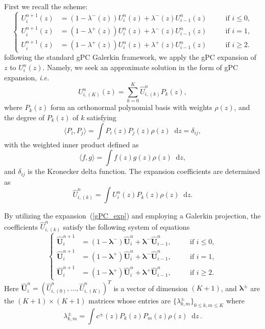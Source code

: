 \documentclass[12pt]{article}
\theoremstyle{plain}
\theoremstyle{remark}
\theoremstyle{remark}
\theoremstyle{remark}
\numberwithin{equation}{section}
\newcommand*\diff{\mathop{}\!\mathrm{d}}
\newcommand{\ie}{{\it i.e. \/}}
\newcommand{\Uniz}{U^n_i(z)}
\newcommand{\Unpiz}{U^{n+1}_i(z)}
\newcommand{\Unimz}{U^n_{i-1}(z)}
\newcommand{\UniK}{U^n_{i,(K)}}
\newcommand{\bhUnpi}{\hat{\bm{U}}_i^{n+1}}
\newcommand{\bhUni}{\hat{\bm{U}}^n_i}
\newcommand{\bhUnim}{\hat{\bm{U}}^n_{i-1}}
\newcommand{\hUnik}{\hat{U}^n_{i,(k)}}
\newcommand{\lpm}{\lambda^{\pm}}
\begin{document}
 First we recall the scheme:
  \begin{equation}\label{dis_scheme_p}
    \left\{
    \begin{aligned}
      \Unpiz &= (1 - \lambda^-(z))\Uniz+\lambda^-(z)\Unimz &\quad& \text{if $i\leq 0$}, \\
      \Unpiz &= (1 - \lambda^+(z))\Uniz+\lambda^-(z)\Unimz && \text{if $i = 1$}, \\
      \Unpiz &= (1 - \lambda^+(z))\Uniz+\lambda^+(z)\Unimz && \text{if $i\geq 2$}. 
    \end{aligned}
    \right.
  \end{equation}
following the standard gPC Galerkin framework, we apply the gPC expansion of $z$ to $\Uniz$. Namely, we seek an approximate solution in the form of gPC expansion, \ie
\begin{equation}\label{gPC_exp}
  \UniK(z) = \sum_{k=0}^K \hUnik P_k(z),
\end{equation}
where $P_k(z)$ form an orthonormal polynomial basis with weights $\rho(z)$, and the degree of $P_k(z)$ of $k$ satisfying 
\begin{equation}
  \langle P_i, P_j \rangle = \int P_i(z)P_j(z)\rho(z)\diff z = \delta_{ij},
\end{equation}
with the weighted inner product defined as
\begin{equation}
  \langle f, g \rangle = \int f(z) g(z)\rho(z)\diff z,
\end{equation}
and $\delta_{ij}$ is the Kronecker delta function. The expansion coefficients are determined as
\begin{equation}
  \hUnik = \int U^n_i(z)P_k(z)\rho(z)\diff z.
\end{equation}

By utilizing the expansion~(\ref{gPC_exp}) and employing a Galerkin projection,  the coefficients $\hUnik$ satisfy the following system of equations
\begin{equation}\label{dis_gPC}
  \left\{
  \begin{aligned}
    \bhUnpi &= (1 - \bm{\lambda}^-) \bhUni + \bm{\lambda}^- \bhUnim, &\quad&\text{if $i\leq 0$}, \\
    \bhUnpi &= (1 - \bm{\lambda}^+) \bhUni + \bm{\lambda}^- \bhUnim, &&\text{if $i=1$}, \\
    \bhUnpi &= (1 - \bm{\lambda}^+) \bhUni + \bm{\lambda}^+ \bhUnim, &&\text{if $i\geq 2$}. 
  \end{aligned}
  \right.
\end{equation}
Here $\bhUni = (\hat{U}^n_{i, (0)}, \dotsc, \hat{U}^n_{i, (K)})^T$ is a
vector of dimension $(K+1)$, and $\bm{\lambda}^{\pm}$ are the $(K+1) \times (K+1)$ matrices whose entries are $\{\lambda^{\pm}_{k,m}\}_{0 \leq k, m \leq K}$ where
\begin{equation}
  \lpm_{k,m} = \int c^{\pm}(z) P_k(z) P_m(z) \rho(z)\diff z\,.
\end{equation}
\end{document}
